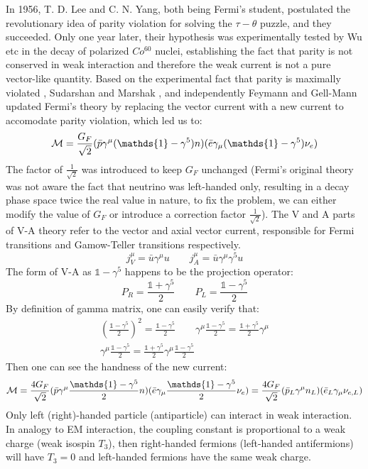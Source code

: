 In 1956, T. D. Lee and C. N. Yang, both being Fermi's student, postulated the
revolutionary idea of parity violation for solving the $\tau-\theta$ puzzle, 
and they succeeded. Only one year later, their hypothesis was experimentally tested
by Wu etc in the decay of polarized $Co^{60}$ nuclei, establishing the fact
that parity is not conserved in weak interaction and therefore the weak 
current is not a pure vector-like quantity. 
Based on the experimental fact that parity is maximally violated \cite{PhysRev.109.1015}, 
Sudarshan and Marshak \cite{PhysRev.109.1860.2}, 
and independently Feymann and Gell-Mann \cite{PhysRev.109.193}
updated Fermi's theory by replacing the vector current with a new current to 
accomodate parity violation, which led us to:
\begin{equation}
    \CM = \frac{G_F}{\sqrt{2}}(\bar{p} \gamma^\mu(\mathds{1} - \gamma^5) n) (\bar{e} \gamma_\mu(\mathds{1} - \gamma^5) \nu_e)
\end{equation}
The factor of $\frac{1}{\sqrt{2}}$ was introduced to keep $G_F$ unchanged (Fermi's
original theory was not aware the fact that neutrino was left-handed only, resulting
in a decay phase space twice the real value in nature, to fix the problem, we can
either modify the value of $G_F$ or introduce a correction factor $\frac{1}{\sqrt{2}}$).
The V and A parts of V-A theory refer to the vector and axial vector current, 
responsible for Fermi transitions and Gamow-Teller transitions respectively.
\begin{equation}
    j_V^\mu = \bar{u}\gamma^\mu u   \qquad 
    j_A^\mu = \bar{u}\gamma^\mu\gamma^5 u   
\end{equation}
The form of V-A as $\mathds{1} - \gamma^5$ happens to be the projection operator:
\begin{equation}
    P_R = \frac{\mathds{1} + \gamma^5}{2}   \qquad P_L = \frac{\mathds{1} - \gamma^5}{2}
\end{equation}
By definition of gamma matrix, one can easily verify that:
\begin{equation}
    \begin{gathered}
	\left(\frac{\mathds{1} - \gamma^5}{2} \right)^2 = \frac{\mathds{1} - \gamma^5}{2} 
	\qquad 
	\gamma^\mu \frac{\mathds{1} - \gamma^5}{2} = \frac{\mathds{1} + \gamma^5}{2} \gamma^\mu \\
	\gamma^\mu \frac{\mathds{1} - \gamma^5}{2} = \frac{\mathds{1} + \gamma^5}{2} \gamma^\mu \frac{\mathds{1}-\gamma^5}{2}
    \end{gathered}
\end{equation}
Then one can see the handness of the new current:
\begin{equation}
    \CM = \frac{4G_F}{\sqrt{2}}(\bar{p} \gamma^\mu\frac{\mathds{1} - \gamma^5}{2} n) (\bar{e} \gamma_\mu\frac{\mathds{1} - \gamma^5}{2} \nu_e) 
    = \frac{4G_F}{\sqrt{2}}(\bar{p}_L \gamma^\mu n_L)(\bar{e}_L \gamma_\mu \nu_{e,L})
\end{equation}
Only left (right)-handed particle (antiparticle) can interact in weak interaction.
In analogy to EM interaction, the coupling constant is proportional to a weak
charge (weak isospin $T_3$), then right-handed fermions (left-handed antifermions) 
will have $T_3 = 0$ and left-handed fermions have the same weak charge. 

